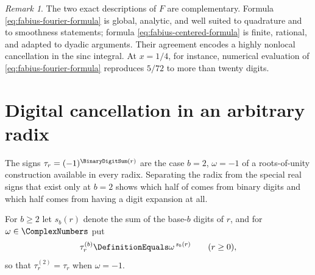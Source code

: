 \documentclass[11pt,a4paper,oneside,openany]{book}
\theoremstyle{definition}
\theoremstyle{remark}
\newtheorem{remark}[remark]{Remark}
\begin{document}
\begin{remark}
The two exact descriptions of $F$ are complementary.  Formula
\eqref{eq:fabius-fourier-formula} is global, analytic, and well suited to quadrature and
to smoothness statements; formula \eqref{eq:fabius-centered-formula} is finite,
rational, and adapted to dyadic arguments.  Their agreement encodes a highly nonlocal
cancellation in the sinc integral.  At $x=1/4$, for instance, numerical evaluation of
\eqref{eq:fabius-fourier-formula} reproduces $5/72$ to more than twenty digits.
\end{remark}

\section{Digital cancellation in an arbitrary radix}

The signs $\tau_r=(-1)^{\BinaryDigitSum(r)}$ are the case $b=2$, $\omega=-1$ of a roots-of-unity construction available in every radix.  Separating the radix from the special real signs that exist only at $b=2$ shows which half of  comes from binary digits and which half comes from having a digit expansion at all.

For $b\ge2$ let $s_b(r)$ denote the sum of the base-$b$ digits of $r$, and for $\omega\in\ComplexNumbers$ put
\begin{equation}\label{eq:radix-b-signs}
 \tau^{(b)}_r\DefinitionEquals\omega^{\,s_b(r)}
 \qquad(r\ge0),
\end{equation}
so that $\tau^{(2)}_r=\tau_r$ when $\omega=-1$.
\end{document}
